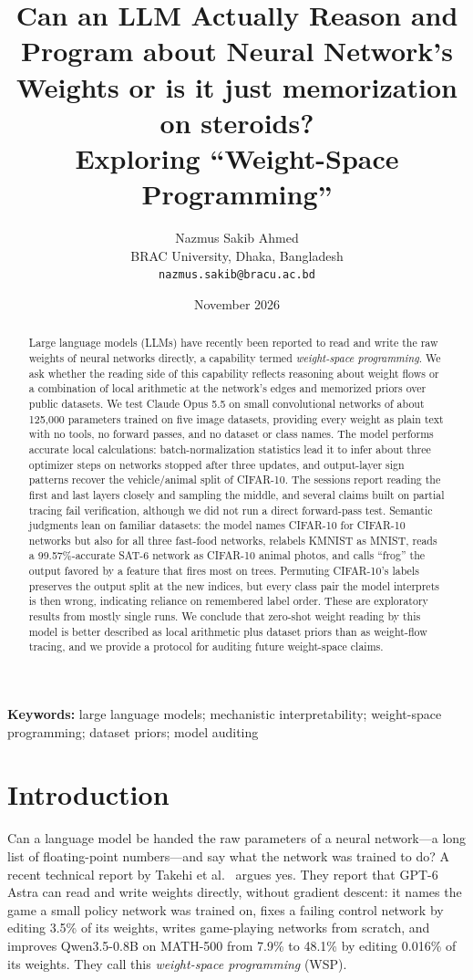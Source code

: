 \documentclass[11pt]{article}
\title{Can an LLM Actually Reason and Program about Neural Network's Weights or is it just memorization on steroids?\\[0.3em] Exploring ``Weight-Space Programming''}
\author{Nazmus Sakib Ahmed\\ BRAC University, Dhaka, Bangladesh\\ \texttt{nazmus.sakib@bracu.ac.bd}}
\date{November 2026}
\begin{document}
\maketitle

\begin{abstract}
Large language models (LLMs) have recently been reported to read and write the raw weights of neural networks directly, a capability termed \emph{weight-space programming}. We ask whether the reading side of this capability reflects reasoning about weight flows or a combination of local arithmetic at the network's edges and memorized priors over public datasets. We test Claude Opus 5.5 on small convolutional networks of about 125,000 parameters trained on five image datasets, providing every weight as plain text with no tools, no forward passes, and no dataset or class names. The model performs accurate local calculations: batch-normalization statistics lead it to infer about three optimizer steps on networks stopped after three updates, and output-layer sign patterns recover the vehicle/animal split of CIFAR-10. The sessions report reading the first and last layers closely and sampling the middle, and several claims built on partial tracing fail verification, although we did not run a direct forward-pass test. Semantic judgments lean on familiar datasets: the model names CIFAR-10 for CIFAR-10 networks but also for all three fast-food networks, relabels KMNIST as MNIST, reads a 99.57\%-accurate SAT-6 network as CIFAR-10 animal photos, and calls ``frog'' the output favored by a feature that fires most on trees. Permuting CIFAR-10's labels preserves the output split at the new indices, but every class pair the model interprets is then wrong, indicating reliance on remembered label order. These are exploratory results from mostly single runs. We conclude that zero-shot weight reading by this model is better described as local arithmetic plus dataset priors than as weight-flow tracing, and we provide a protocol for auditing future weight-space claims.
\end{abstract}

\noindent\textbf{Keywords:} large language models; mechanistic interpretability; weight-space programming; dataset priors; model auditing

\section{Introduction}

Can a language model be handed the raw parameters of a neural network---a long list of floating-point numbers---and say what the network was trained to do? A recent technical report by Takehi et al.~\cite{takehi} argues yes. They report that GPT-6 Astra can read and write weights directly, without gradient descent: it names the game a small policy network was trained on, fixes a failing control network by editing 3.5\% of its weights, writes game-playing networks from scratch, and improves Qwen3.5-0.8B on MATH-500 from 7.9\% to 48.1\% by editing 0.016\% of its weights. They call this \emph{weight-space programming} (WSP).
\end{document}
